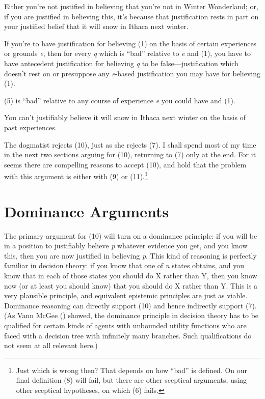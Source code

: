 \documentclass[
  11pt,
  letterpaper,
  DIV=11,
  numbers=noendperiod,
  twoside]{scrartcl}
\providecommand{\tightlist}{%
  \setlength{\itemsep}{0pt}\setlength{\parskip}{0pt}}
\begin{document}
\begin{description}
\tightlist
\item[(9)]
Either you're not justified in believing that you're not in Winter
Wonderland; or, if you are justified in believing this, it's because
that justification rests in part on your justified belief that it will
snow in Ithaca next winter.
\item[(10)]
If you're to have justification for believing (1) on the basis of
certain experiences or grounds \emph{e}, then for every \emph{q} which
is ``bad'' relative to \emph{e} and (1), you have to have antecedent
justification for believing \emph{q} to be false---justification which
doesn't rest on or presuppose any \emph{e}-based justification you may
have for believing (1).
\item[(11)]
(5) is ``bad'' relative to any course of experience \emph{e} you could
have and (1).
\item[C]
You can't justifiably believe it will snow in Ithaca next winter on the
basis of past experiences.
\end{description}

The dogmatist rejects (10), just as she rejects (7). I shall spend most
of my time in the next two sections arguing for (10), returning to (7)
only at the end. For it seems there are compelling reasons to accept
(10), and hold that the problem with this argument is either with (9) or
(11).\footnote{Just which is wrong then? That depends on how ``bad'' is
  defined. On our final definition (8) will fail, but there are other
  sceptical arguments, using other sceptical hypotheses, on which (6)
  fails.}

\section{Dominance Arguments}\label{dominance-arguments}

The primary argument for (10) will turn on a dominance principle: if you
will be in a position to justifiably believe \emph{p} whatever evidence
you get, and you know this, then you are now justified in believing
\emph{p}. This kind of reasoning is perfectly familiar in decision
theory: if you know that one of \emph{n} states obtains, and you know
that in each of those states you should do X rather than Y, then you
know now (or at least you should know) that you should do X rather than
Y. This is a very plausible principle, and equivalent epistemic
principles are just as viable. Dominance reasoning can directly support
(10) and hence indirectly support (7). (As Vann McGee
() showed, the dominance principle in
decision theory has to be qualified for certain kinds of agents with
unbounded utility functions who are faced with a decision tree with
infinitely many branches. Such qualifications do not seem at all
relevant here.)
\end{document}
